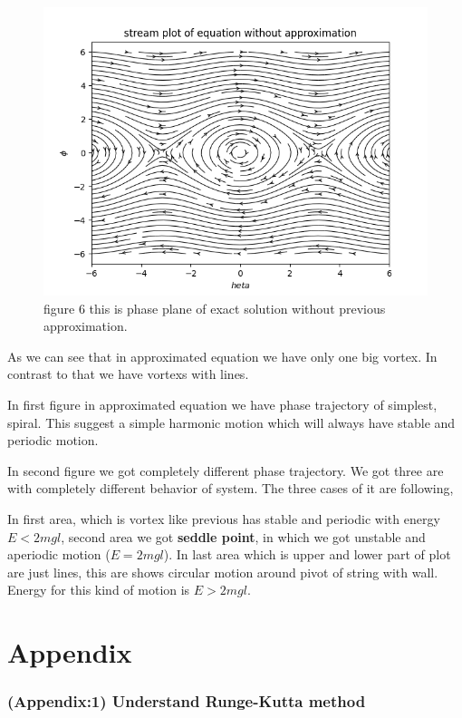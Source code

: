 \documentclass[11pt,a4paper]{article}
\begin{document}
\begin{figure}[htbp]
\centering
\includegraphics[width=0.8 \textwidth]{exactlstr.png}
\caption{\label{fig:orgdf3a90a}figure 6 this is phase plane of exact solution without previous approximation.}
\end{figure}

As we can see that in approximated equation we have only one big vortex. In contrast to that we have vortexs with lines.

In first figure in approximated equation we have phase trajectory of simplest, spiral. This suggest a simple harmonic motion which will always have stable and periodic motion.

In second figure we got completely different phase trajectory. We got three are with completely different behavior of system. The three cases of it are following,

In first area, which is vortex like previous has stable and periodic with energy \(E<2mgl\), second area we got \textbf{seddle point}, in which we got unstable and aperiodic motion (\(E=2mgl\)). In last area which is upper and lower part of plot are just lines, this are shows circular motion around pivot of string with wall. Energy for this kind of motion is \(E>2mgl\).











\break

\section{Appendix}
\label{sec:org9b97c85}
\subsubsection{(Appendix:1) Understand Runge-Kutta method}
\label{sec:org97a202d}
\end{document}
